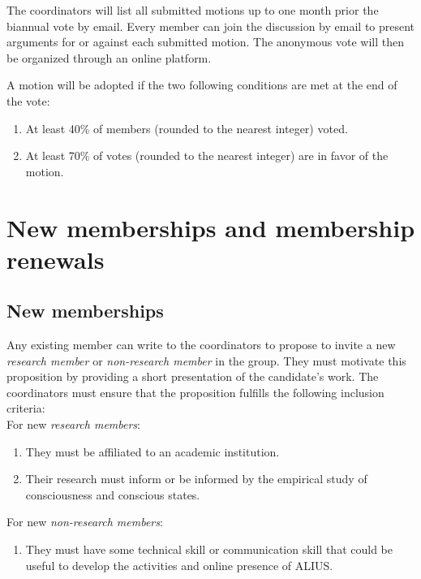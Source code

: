 \documentclass[a4paper, 11pt]{scrartcl}
\begin{document}
The coordinators will list all submitted motions up to one month prior the biannual vote by email. Every member can join the discussion by email to present arguments for or against each submitted motion. The anonymous vote will then be organized through an online platform. 

A motion will be adopted if the two following conditions are met at the end of the vote:

\begin{enumerate}
\item At least 40\% of members (rounded to the nearest integer) voted.
\item At least 70\% of votes (rounded to the nearest integer) are in favor of the motion.
\end{enumerate} 

\section{New memberships and membership renewals}

\subsection{New memberships}
\label{new_memberships}

Any existing member can write to the coordinators to propose to invite a new \emph{research member} or \emph{non-research member} in the group. They must motivate this proposition by providing a short presentation of the candidate's work. The coordinators must ensure that the proposition fulfills the following inclusion criteria: \\

For new \emph{research members}:

\begin{enumerate}
\item They must be affiliated to an academic institution. 
\item Their research must inform or be informed by the empirical study of consciousness and conscious states. 

\end{enumerate}


For new \emph{non-research members}:   

\begin{enumerate}

\item They must have some technical skill or communication skill that could be useful to develop the activities and online presence of ALIUS.

\end{enumerate}
\end{document}

